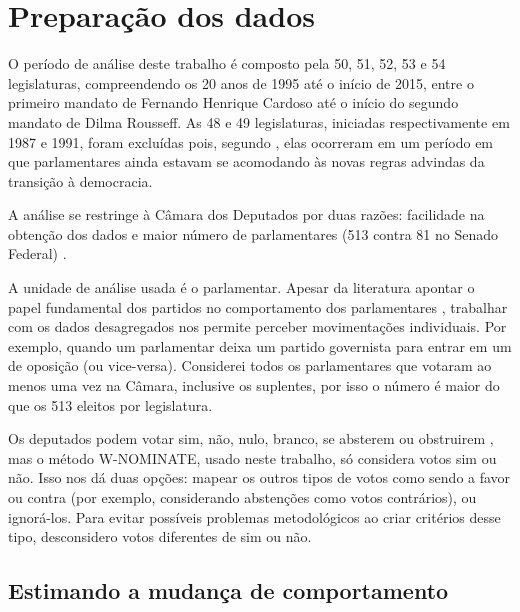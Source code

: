 \documentclass[a4paper,titlepage]{ppgi}\usepackage[]{graphicx}\usepackage[]{color}
\begin{document}
\section{Preparação dos dados}


O período de análise deste trabalho é composto pela 50\textordfeminine{},
51\textordfeminine{}, 52\textordfeminine{}, 53\textordfeminine{} e
54\textordfeminine{} legislaturas, compreendendo os 20 anos de 1995 até o
início de 2015, entre o primeiro mandato de Fernando Henrique Cardoso até o
início do segundo mandato de Dilma Rousseff. As 48\textordfeminine{} e
49\textordfeminine{} legislaturas, iniciadas respectivamente em 1987 e 1991,
foram excluídas pois, segundo , elas ocorreram em um
período em que parlamentares ainda estavam se acomodando às novas regras
advindas da transição à democracia.


A análise se restringe à Câmara dos Deputados por duas razões: facilidade na
obtenção dos dados e maior número de parlamentares (513 contra 81 no Senado
Federal) \cite{Vicente2012}.

A unidade de análise usada é o parlamentar. Apesar da literatura apontar o
papel fundamental dos partidos no comportamento dos parlamentares
\cite{Figueiredo2001,Santos2003,Freitas2008}, trabalhar com os dados
desagregados nos permite perceber movimentações individuais. Por exemplo,
quando um parlamentar deixa um partido governista para entrar em um de oposição
(ou vice-versa). Considerei todos os parlamentares que votaram ao menos uma
vez na Câmara, inclusive os suplentes, por isso o número é maior do que os 513
eleitos por legislatura.  


Os deputados podem votar sim, não, nulo, branco, se absterem ou obstruirem
\cite{Carneiro2013}, mas o método W-NOMINATE, usado neste trabalho, só
considera votos sim ou não. Isso nos dá duas opções: mapear os outros tipos de
votos como sendo a favor ou contra (por exemplo, considerando abstenções como
votos contrários), ou ignorá-los. Para evitar possíveis problemas metodológicos
ao criar critérios desse tipo, desconsidero votos diferentes de sim ou não.

\subsection{Estimando a mudança de comportamento}
\label{cap:desenvolvimento:estimando-mudanca-comportamento}
\end{document}
